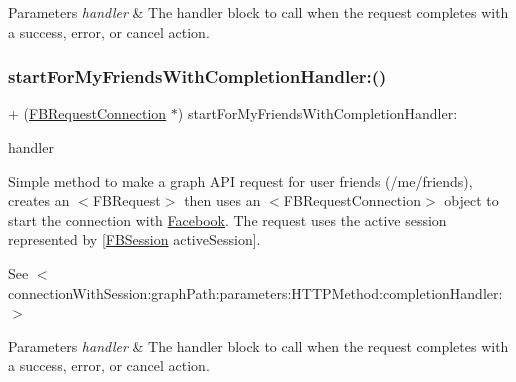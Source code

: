 \begin{DoxyParams}{Parameters}
{\em handler} & The handler block to call when the request completes with a success, error, or cancel action. \\
\hline
\end{DoxyParams}
\mbox{\label{interfaceFBRequestConnection_a1eeb9942474312db3197be0fa569bc60}} 
\subsubsection{\texorpdfstring{start\+For\+My\+Friends\+With\+Completion\+Handler\+:()}{startForMyFriendsWithCompletionHandler:()}\hspace{0.1cm}{\footnotesize\ttfamily [5/5]}}
{\footnotesize\ttfamily + (\hyperlink{interfaceFBRequestConnection}{F\+B\+Request\+Connection} $\ast$) start\+For\+My\+Friends\+With\+Completion\+Handler\+: \begin{DoxyParamCaption}\item[{(F\+B\+Request\+Handler)}]{handler }\end{DoxyParamCaption}}

Simple method to make a graph A\+PI request for user friends (/me/friends), creates an $<$\+F\+B\+Request$>$ then uses an $<$\+F\+B\+Request\+Connection$>$ object to start the connection with \hyperlink{interfaceFacebook}{Facebook}. The request uses the active session represented by {\ttfamily \mbox{[}\hyperlink{interfaceFBSession}{F\+B\+Session} active\+Session\mbox{]}}.

See $<$connection\+With\+Session\+:graph\+Path\+:parameters\+:\+H\+T\+T\+P\+Method\+:completion\+Handler\+:$>$


\begin{DoxyParams}{Parameters}
{\em handler} & The handler block to call when the request completes with a success, error, or cancel action. \\
\hline
\end{DoxyParams}
\mbox{\label{interfaceFBRequestConnection_abc6f5878bcfabf0b419347a4cbfb2f68}} 
